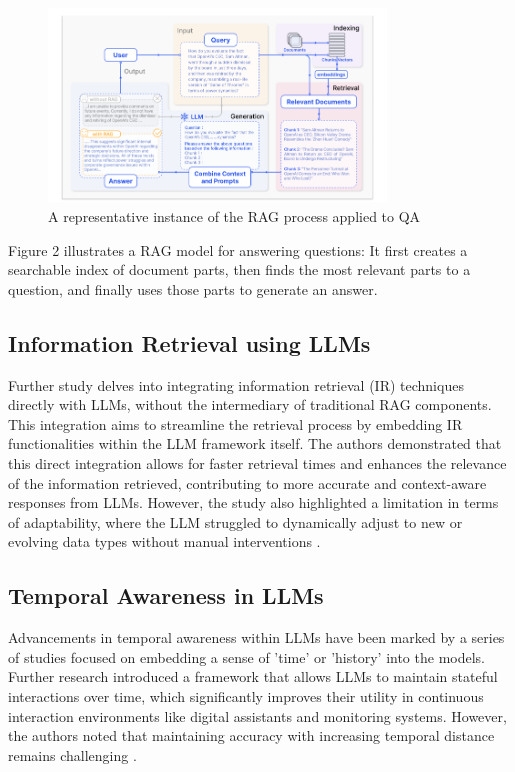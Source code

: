 \begin{figure}[H]
\centering
\includegraphics[width=0.8\textwidth]{Ref. 2.png}
\caption{A representative instance of the RAG process applied to QA \parencite{gao2023retrieval}}
\end{figure}

Figure 2 illustrates a RAG model for answering questions: It first creates a searchable index of document parts, then finds the most relevant parts to a question, and finally uses those parts to generate an answer.

\subsection{Information Retrieval using LLMs}

Further study delves into integrating information retrieval (IR) techniques directly with LLMs, without the intermediary of traditional RAG components. This integration aims to streamline the retrieval process by embedding IR functionalities within the LLM framework itself. The authors demonstrated that this direct integration allows for faster retrieval times and enhances the relevance of the information retrieved, contributing to more accurate and context-aware responses from LLMs. However, the study also highlighted a limitation in terms of adaptability, where the LLM struggled to dynamically adjust to new or evolving data types without manual interventions \parencite{ai2023information}.

\subsection{Temporal Awareness in LLMs}

Advancements in temporal awareness within LLMs have been marked by a series of studies focused on embedding a sense of 'time' or 'history' into the models. 
Further research introduced a framework that allows LLMs to maintain stateful interactions over time, which significantly improves their utility in continuous interaction environments like digital assistants and monitoring systems. However, the authors noted that maintaining accuracy with increasing temporal distance remains challenging \parencite{chen2023temporal}. \\

